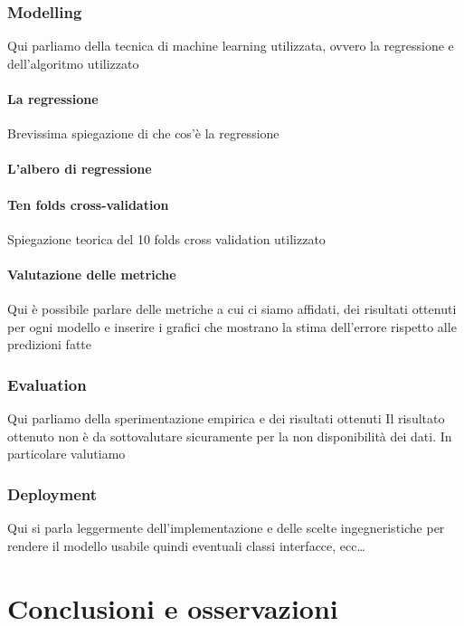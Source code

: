 \documentclass[a4paper, 11pt, oneside]{report}
\begin{document}
            \section{Modelling}
            Qui parliamo della tecnica di machine learning utilizzata, ovvero la regressione e dell'algoritmo utilizzato
                \subsection{La regressione}
                Brevissima spiegazione di che cos'è la regressione
                \subsection{L'albero di regressione}

                \subsection{Ten folds cross-validation}
                Spiegazione teorica del 10 folds cross validation utilizzato
                \subsection{Valutazione delle metriche}
                Qui è possibile parlare delle metriche a cui ci siamo affidati, dei risultati ottenuti per ogni modello
                e inserire i grafici che mostrano la stima dell'errore rispetto alle predizioni fatte

            \section{Evaluation}
            Qui parliamo della sperimentazione empirica e dei risultati ottenuti
            Il risultato ottenuto non è da sottovalutare sicuramente per la non disponibilità dei dati.
            In particolare valutiamo

            \section{Deployment}
            Qui si parla leggermente dell'implementazione e delle scelte ingegneristiche per rendere il modello usabile
            quindi eventuali classi interfacce, ecc\ldots


    \part{Conclusioni e osservazioni}
\end{document}
